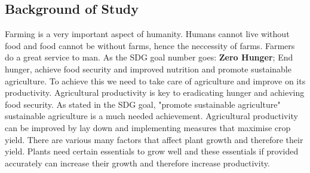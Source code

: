 \documentclass[12pt, a4paper]{article}
\begin{document}
\subsection{Background of Study}
Farming is a very important aspect of humanity. Humans cannot live without food and food cannot be without farms, hence the neccessity of farms. Farmers do a great service to man. As the SDG goal number goes: \textbf{Zero Hunger}; End hunger, achieve food security and improved nutrition and promote sustainable agriculture. To achieve this we need to take care of agriculture and improve on its productivity. Agricultural productivity is key to eradicating hunger and achieving food security. As stated in the SDG goal, "promote sustainable agriculture" sustainable agriculture is a much needed achievement. Agricultural productivity can be improved by lay down and implementing measures that maximise crop yield. There are various many factors that affect plant growth and therefore their yield. Plants need certain essentials to grow well and these essentials if provided accurately can increase their growth and therefore increase productivity.
\\
\end{document}

